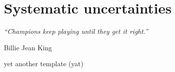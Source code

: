 \chapter{Systematic uncertainties}
\label{ch:systematics}
\epigraph{\emph{“Champions keep playing until they get it right.”}}{Billie Jean King}

yet another template (yat)